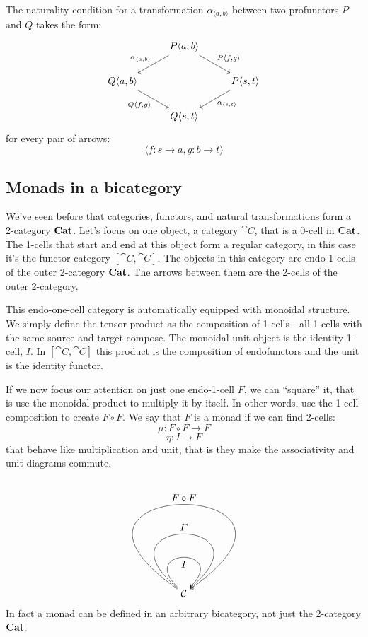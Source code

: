 \documentclass[DaoFP]{subfiles}
\begin{document}
The naturality condition for a transformation $\alpha_{\langle a, b \rangle}$ between two profunctors $P$ and $Q$ takes the form:
\[
 \begin{tikzcd}
 &P \langle a, b \rangle
 \arrow[ld, "{\alpha_{\langle a, b \rangle}}"']
 \arrow[rd, "{P \langle f, g \rangle}"]
 \\
 Q \langle a, b \rangle
 \arrow[dr, "{Q \langle f, g \rangle}"']
 &&P \langle s, t \rangle
 \arrow[dl, "{\alpha_{\langle s, t \rangle}}"]
 \\
 & Q \langle s, t \rangle
 \end{tikzcd}
\]
for every pair of arrows:
\[ \langle f \colon s \to a, g \colon b \to t \rangle \]

\subsection{Monads in a bicategory}

We've seen before that categories, functors, and natural transformations form a 2-category $\mathbf{Cat}$. Let's focus on one object, a category $\cat C$, that is a 0-cell in $\mathbf{Cat}$. The 1-cells that start and end at this object form a regular category, in this case it's the functor category $[\cat C, \cat C]$. The objects in this category are endo-1-cells of the outer 2-category $\mathbf{Cat}$. The arrows between them are the 2-cells of the outer 2-category.

This endo-one-cell category is automatically equipped with monoidal structure. We simply define the tensor product as the composition of 1-cells---all 1-cells with the same source and target compose. The monoidal unit object is the identity 1-cell, $I$. In $[\cat C, \cat C]$ this product is the composition of endofunctors and the unit is the identity functor. 

If we now focus our attention on just one endo-1-cell $F$, we can ``square'' it, that is use the monoidal product to multiply it by itself. In other words, use the 1-cell composition to create $F \circ F$. We say that $F$ is a monad if we can find 2-cells:
\[ \mu \colon F \circ F \to F \]
\[ \eta \colon I \to F \]
that behave like multiplication and unit, that is they make the associativity and unit diagrams commute. 
\[
   \begin{tikzpicture}
        \node [] (star) {$\cat C$} ;
        \path[->,draw] (star) to  [in=45,out=135, loop,distance=2cm] node[ below] {$I$} (star);
        \path[->,draw] (star) to  [in=40,out=140, loop,distance=4cm] node[above] {$F$} (star);
        \path[->,draw] (star) to  [ in=35,out=145, loop,distance=7cm] node[auto] {$F \circ F$} (star);
    \end{tikzpicture}
\]
In fact a monad can be defined in an arbitrary bicategory, not just the 2-category $\mathbf{Cat}$. 
\end{document}
